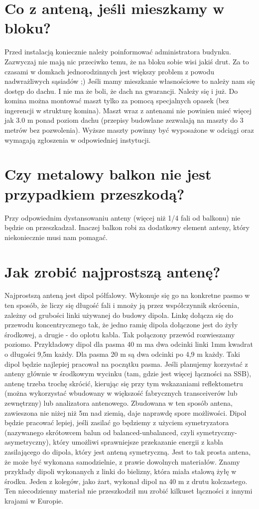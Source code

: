 \documentclass[a4paper,12pt]{article}
\begin{document}
\section{Co z anteną, jeśli mieszkamy w bloku?}
Przed instalacją koniecznie należy poinformować administratora budynku. Zazwyczaj nie mają nic przeciwko temu, że na bloku sobie wisi jakiś drut. Za to czasami w domkach jednorodzinnych jest większy problem z powodu nadwrażliwych sąsiadów ;)
Jeśli mamy mieszkanie własnościowe to należy nam się dostęp do dachu. I nie ma że boli, że dach na gwarancji. Należy się i już.
Do komina można montować maszt tylko za pomocą specjalnych opasek (bez ingerencji w strukturę komina). Maszt wraz z antenami nie powinien mieć więcej jak 3.0 m ponad poziom dachu (przepisy budowlane zezwalają na maszty do 3 metrów bez pozwolenia). Wyższe maszty powinny być wyposażone w odciągi oraz wymagają zgłoszenia w odpowiedniej instytucji.

\section{Czy metalowy balkon nie jest przypadkiem przeszkodą?}
Przy odpowiednim dystansowaniu anteny (więcej niż 1/4 fali od balkonu) nie będzie on przeszkadzał. Inaczej balkon robi za dodatkowy element anteny, który niekoniecznie musi nam pomagać.

\section{Jak zrobić najprostszą antenę?}
Najprostszą anteną jest dipol półfalowy. Wykonuje się go na konkretne pasmo w ten sposób, że liczy się długość fali i mnoży ją przez współczynnik skrócenia, zależny od grubości linki używanej do budowy dipola. Linkę dołącza się do przewodu koncentrycznego tak, że jedno ramię dipola dołączone jest do żyły środkowej, a drugie - do oplotu kabla. Tak połączony przewód rozwieszamy poziomo. Przykładowy dipol dla pasma 40 m ma dwa odcinki linki 1mm kwadrat o długości 9,5m każdy. Dla pasma 20 m są dwa odcinki po 4,9 m każdy. Taki dipol będzie najlepiej pracował na początku pasma. Jeśli planujemy korzystać z anteny głównie w środkowym wycinku (tam, gdzie jest więcej łączności na SSB), antenę trzeba trochę skrócić, kierując się przy tym wskazaniami reflektometru (można wykorzystać wbudowany w większość fabrycznych transceiverów lub zewnętrzny) lub analizatora antenowego. Zbudowana w ten sposób antena, zawieszona nie niżej niż 5m nad ziemią, daje naprawdę spore możliwości. Dipol będzie pracować lepiej, jeśli zasilać go będziemy z użyciem symetryzatora (nazywanego skrótowcem balun od balanced-unbalanced, czyli symetryczny-asymetryczny), który umożliwi sprawniejsze przekazanie energii z kabla zasilającego do dipola, który jest anteną symetryczną.
Jest to tak prosta antena, że może być wykonana samodzielnie, z prawie dowolnych materiałów. Znamy przykłady dipoli wykonanych z linki do bielizny, która miała stalową żyłę w środku. Jeden z kolegów, jako żart, wykonał dipol na 40 m z drutu kolczastego. Ten niecodzienny materiał nie przeszkodził mu zrobić kilkuset łączności z innymi krajami w Europie.
\end{document}
